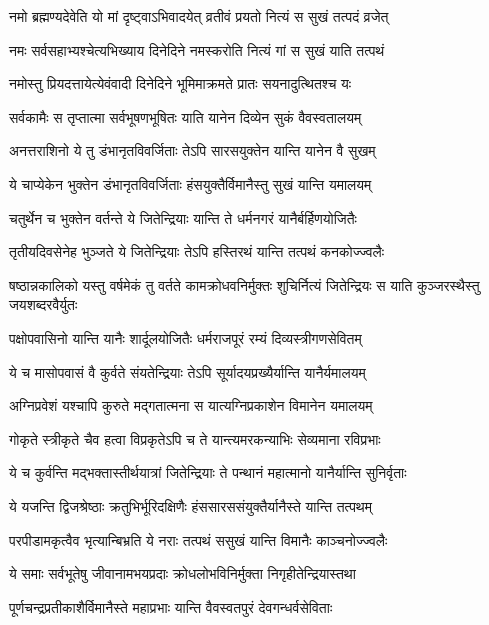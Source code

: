 \twolineshloka
{नमो ब्रह्मण्यदेवेति यो मां दृष्ट्वाऽभिवादयेत्}
{व्रतीवं प्रयतो नित्यं स सुखं तत्पदं व्रजेत्}


\twolineshloka
{नमः सर्वसहाभ्यश्चेत्यभिख्याय दिनेदिने}
{नमस्करोति नित्यं गां स सुखं याति तत्पथं}


\twolineshloka
{नमोस्तु प्रियदत्तायेत्येवंवादी दिनेदिने}
{भूमिमाक्रमते प्रातः सयनादुत्थितश्च यः}


\twolineshloka
{सर्वकामैः स तृप्तात्मा सर्वभूषणभूषितः}
{याति यानेन दिव्येन सुकं वैवस्वतालयम्}


\twolineshloka
{अनत्तराशिनो ये तु डंभानृतविवर्जिताः}
{तेऽपि सारसयुक्तेन यान्ति यानेन वै सुखम्}


\twolineshloka
{ये चाप्येकेन भुक्तेन डंभानृतविवर्जिताः}
{हंसयुक्तैर्विमानैस्तु सुखं यान्ति यमालयम्}


\twolineshloka
{चतुर्थेन च भुक्तेन वर्तन्ते ये जितेन्द्रियाः}
{यान्ति ते धर्मनगरं यानैर्बर्हिणयोजितैः}


\twolineshloka
{तृतीयदिवसेनेह भुञ्जते ये जितेन्द्रियाः}
{तेऽपि हस्तिरथं यान्ति तत्पथं कनकोज्ज्वलैः}


\threelineshloka
{षष्ठान्नकालिको यस्तु वर्षमेकं तु वर्तते}
{कामक्रोधवनिर्मुक्तः शुचिर्नित्यं जितेन्द्रियः}
{स याति कुञ्जरस्थैस्तु जयशब्दरवैर्युतः}


\twolineshloka
{पक्षोपवासिनो यान्ति यानैः शार्दूलयोजितैः}
{धर्मराजपूरं रम्यं दिव्यस्त्रीगणसेवितम्}


\twolineshloka
{ये च मासोपवासं वै कुर्वते संयतेन्द्रियाः}
{तेऽपि सूर्यादयप्रख्यैर्यान्ति यानैर्यमालयम्}


\twolineshloka
{अग्निप्रवेशं यश्चापि कुरुते मद्गतात्मना}
{स यात्यग्निप्रकाशेन विमानेन यमालयम्}


\twolineshloka
{गोकृते स्त्रीकृते चैव हत्वा विप्रकृतेऽपि च}
{ते यान्त्यमरकन्याभिः सेव्यमाना रविप्रभाः}


\twolineshloka
{ये च कुर्वन्ति मद्भक्तास्तीर्थयात्रां जितेन्द्रियाः}
{ते पन्थानं महात्मानो यानैर्यान्ति सुनिर्वृताः}


\twolineshloka
{ये यजन्ति द्विजश्रेष्ठाः क्रतुभिर्भूरिदक्षिणैः}
{हंससारससंयुक्तैर्यानैस्ते यान्ति तत्पथम्}


\twolineshloka
{परपीडामकृत्वैव भृत्यान्बिभ्रति ये नराः}
{तत्पथं ससुखं यान्ति विमानैः काञ्चनोज्ज्वलैः}


\threelineshloka
{ये समाः सर्वभूतेषु जीवानामभयप्रदाः}
{क्रोधलोभविनिर्मुक्ता निगृहीतेन्द्रियास्तथा}
{}


\twolineshloka
{पूर्णचन्द्रप्रतीकाशैर्विमानैस्ते महाप्रभाः}
{यान्ति वैवस्वतपुरं देवगन्धर्वसेविताः}


